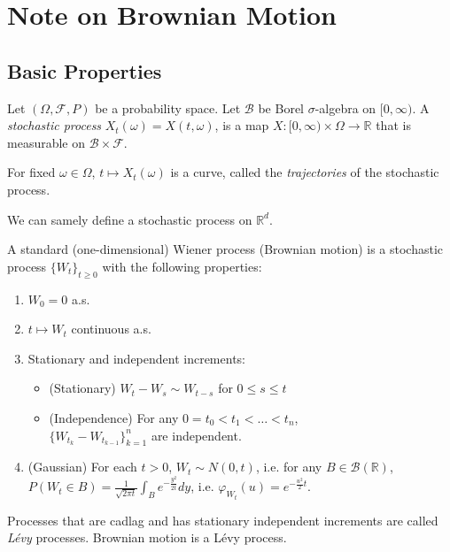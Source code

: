 \section{Note on Brownian Motion}

\subsection{Basic Properties}

\begin{definition}
	Let $(\Omega, \mathcal{F}, P)$ be a probability space. Let $\mathcal{B}$ be Borel $\sigma$-algebra on $[0,\infty )$. A \textit{stochastic process} $X_t (\omega) = X(t, \omega)$, is a map $X: [0,\infty ) \times \Omega \to \mathbb{R}$ that is measurable on $\mathcal{B} \times \mathcal{F}$. 

	For fixed $\omega \in \Omega$, $t \mapsto X_t(\omega)$ is a curve, called the \textit{trajectories} of the stochastic process.

	We can samely define a stochastic process on $\mathbb{R}^d$.
\end{definition}

\begin{definition}
	A standard (one-dimensional) Wiener process (Brownian motion) is a stochastic process $\{W_t\} _{t \ge 0}$ with the following properties:
	\begin{enumerate}
		\item $W_0 = 0$ a.s.
		\item $t \mapsto W_t$ continuous a.s.
		\item Stationary and independent increments:
			\begin{itemize}
				\item (Stationary) $W_t - W_s \sim W_{t - s}$ for $0 \le s \le t$
				\item (Independence) For any $0 = t_0 < t_1 < \ldots < t_n$, \\$\{W_{t_k} - W_{t_{k-1}}\}_{k = 1}^n $ are independent.
			\end{itemize}
		\item (Gaussian) For each $t > 0$, $W_t \sim N(0,t)$, i.e. for any $B \in \mathcal{B}(\mathbb{R})$, $P(W_t \in B) = \frac{1}{\sqrt{2 \pi t} }\int _B e^{- \frac{y^2}{ 2 t}}d y$, i.e. $\varphi_{W_t}(u) = e^{- \frac{u^2}{2}t}$.
	\end{enumerate}
\end{definition}

\begin{remark}
	Processes that are cadlag and has stationary independent increments are called \textit{L\'evy} processes. Brownian motion is a L\'evy process.
\end{remark}

